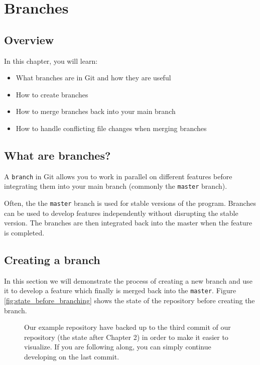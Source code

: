 \documentclass[../main/git_course_main.tex]{subfiles}
\begin{document}
\setcounter{chapter}{3}
\chapter{Branches}

\section{Overview}

In this chapter, you will learn:

\begin{itemize}
	\item What branches are in Git and how they are useful
	\item How to create branches
	\item How to merge branches back into your main branch
	\item How to handle conflicting file changes when merging branches
\end{itemize}

\section{What are branches?}

A \verb$branch$ in Git allows you to work in parallel on different features before integrating them into your main branch (commonly the \verb$master$ branch).

Often, the the \verb$master$ branch is used for stable versions of the program. Branches can be used to develop features independently without disrupting the stable version. The branches are then integrated back into the master when the feature is completed.

\section{Creating a branch}

In this section we will demonstrate the process of creating a new branch and use it to develop a feature which finally is merged back into the \verb$master$. Figure \ref{fig:state_before_branching} shows the state of the repository before creating the branch. 

\begin{figure}[h!]
\begin{redbox}
Our example repository have backed up to the third commit of our repository (the state after Chapter 2) in order to make it easier to visualize. If you are following along, you can simply continue developing on the last commit.
\end{redbox}
\end{figure}
\end{document}
